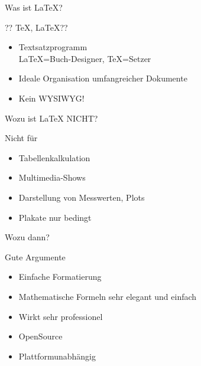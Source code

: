 \documentclass[hyperref={pdfpagelabels=false}]{beamer}
\begin{document}
\begin{frame}{Was ist \LaTeX{}?}
    \begin{block}{?? \TeX{}, \LaTeX{}??}
        \begin{itemize}
            \item Textsatzprogramm\\
            \LaTeX{}=Buch-Designer, \TeX{}=Setzer
            \item Ideale Organisation umfangreicher Dokumente
            \item Kein WYSIWYG!
        \end{itemize}
    \end{block}
\end{frame}
\begin{frame}{Wozu ist \LaTeX{} NICHT?}
    \begin{block}{Nicht für}
        \begin{itemize}
            \item Tabellenkalkulation
            \item Multimedia-Shows
            \item Darstellung von Messwerten, Plots
            \item Plakate nur bedingt
        \end{itemize}
    \end{block}
\end{frame}
\begin{frame}{Wozu dann?}
    \begin{block}{Gute Argumente}
        \begin{itemize}
            \item Einfache Formatierung
            \item Mathematische Formeln sehr elegant und einfach
            \item Wirkt sehr professionel
            \item OpenSource
            \item Plattformunabhängig
        \end{itemize}
    \end{block}
\end{frame}
\end{document}
